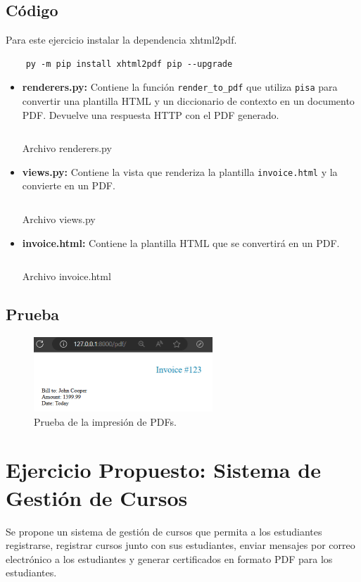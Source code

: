 \documentclass{article}
\newenvironment{block}{\captionsetup{type=listing}}{}
\begin{document}
\subsection{Código}
Para este ejercicio instalar la dependencia xhtml2pdf.
\begin{lstlisting}
	py -m pip install xhtml2pdf pip --upgrade
\end{lstlisting}
\begin{itemize}
	\item \textbf{renderers.py:} Contiene la función \texttt{render\_to\_pdf} que utiliza \texttt{pisa} para convertir una plantilla HTML y un diccionario de contexto en un documento PDF. Devuelve una respuesta HTTP con el PDF generado.
	      \begin{block}
		      \inputminted{python}{../print_pdfs/app/renderers.py}
		      \caption{Archivo renderers.py}
	      \end{block}
	\item \textbf{views.py:} Contiene la vista que renderiza la plantilla \texttt{invoice.html} y la convierte en un PDF.
	      \begin{block}
		      \inputminted{python}{../print_pdfs/app/views.py}
		      \caption{Archivo views.py}
	      \end{block}
	\item \textbf{invoice.html:} Contiene la plantilla HTML que se convertirá en un PDF.
	      \begin{block}
		      \inputminted{html}{../print_pdfs/app/templates/pdf/invoice.html}
		      \caption{Archivo invoice.html}
	      \end{block}
\end{itemize}

\subsection{Prueba}
\begin{figure}[H]
	\centering
	\includegraphics[width=0.6\textwidth,keepaspectratio]{img/print_pdf.png}
	\caption{Prueba de la impresión de PDFs.}
\end{figure}


\section{Ejercicio Propuesto: Sistema de Gestión de Cursos}
Se propone un sistema de gestión de cursos que permita a los estudiantes registrarse, registrar cursos junto con sus estudiantes, enviar mensajes por correo electrónico a los estudiantes y generar certificados en formato PDF para los estudiantes.
\end{document}
